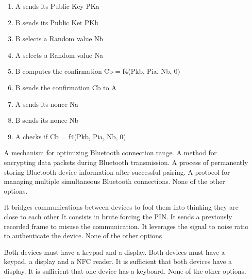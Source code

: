 \begin{solution}
    \begin{enumerate}
        \item A sends its Public Key PKa
        \item B sends its Public Ket PKb
        \item B selects a Random value Nb
        \item A selects a Random value Na
        \item B computes the confirmation Cb = f4(Pkb, Pia, Nb, 0)
        \item B sends the confirmation Cb to A
        \item A sends its nonce Na
        \item B sends its nonce Nb
        \item A checks if Cb = f4(Pkb, Pia, Nb, 0)
    \end{enumerate}
\end{solution}

\begin{checkboxes}
    \choice A mechanism for optimizing Bluetooth connection range.
    \choice A method for encrypting data packets during Bluetooth transmission.
    \CorrectChoice A process of permanently storing Bluetooth device information after successful pairing.
    \choice A protocol for managing multiple simultaneous Bluetooth connections.
    \choice None of the other options.
\end{checkboxes}

\begin{checkboxes}
    \CorrectChoice It bridges communications between devices to fool them into thinking they are close to each other
    \choice It consists in brute forcing the PIN.
    \choice It sends a previously recorded frame to misuse the communication.
    \choice It leverages the signal to noise ratio to authenticate the device.
    \choice None of the other options
\end{checkboxes}

\begin{checkboxes}
    \choice Both devices must have a keypad and a display.
    \choice Both devices must have a keypad, a display and a NFC reader.
    \choice It is sufficient that both devices have a display.
    \choice It is sufficient that one device has a keyboard.
    \CorrectChoice None of the other options.
\end{checkboxes}

